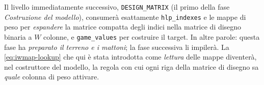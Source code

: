 Il livello immediatamente successivo, \texttt{DESIGN\_MATRIX} (il primo della
fase \emph{Costruzione del modello}), consumerà esattamente
\texttt{hlp\_indexes} e le mappe di peso per \emph{espandere} la matrice
compatta degli indici nella matrice di disegno binaria a $W$ colonne, e
\texttt{game\_values} per costruire il target. In altre parole: questa fase ha
\emph{preparato il terreno e i mattoni}; la fase successiva li impilerà. La
\eqref{eq:iwmap-lookup} che qui è stata introdotta come \emph{lettura} delle
mappe diventerà, nel costruttore del modello, la regola con cui ogni riga
della matrice di disegno sa \emph{quale} colonna di peso attivare.
